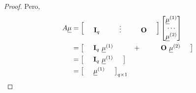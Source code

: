 \documentclass[
]{book}
\theoremstyle{definition}
\theoremstyle{definition}
\theoremstyle{definition}
\theoremstyle{definition}
\theoremstyle{remark}
\begin{document}
\begin{proof}
Pero,
\begin{align*}
A\underline{\mu}&= \begin{bmatrix}
\hspace{0.5cm} \mathbf{I}_q \hspace{1.0cm} \vdots \hspace{1.0cm} \mathbf{O} \hspace{0.5cm}
 \end{bmatrix} \begin{bmatrix}
\underline{\mu}^{(1)} \\ \cdots \\ \underline{\mu}^{(2)}
\end{bmatrix}\\
&=\begin{bmatrix}
\hspace{0.5cm} \mathbf{I}_q \ \underline{\mu}^{(1)} \hspace{1.0cm} + \hspace{1.0cm} \mathbf{O}\  \underline{\mu}^{(2)} \hspace{0.5cm}
 \end{bmatrix}\\
&=\begin{bmatrix}
\hspace{0.5cm} \mathbf{I}_q \ \underline{\mu}^{(1)}  \hspace{0.5cm}
 \end{bmatrix}\\
&= \begin{bmatrix}
\hspace{0.5cm}  \underline{\mu}^{(1)}  \hspace{0.5cm}
 \end{bmatrix}_{q\times 1}
\end{align*}


\end{proof}
\end{document}

